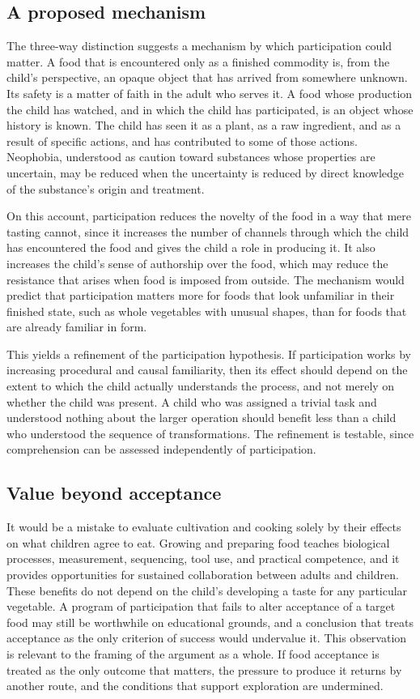 \documentclass[11pt]{article}
\theoremstyle{remark}
\begin{document}
\subsection{A proposed mechanism}

The three-way distinction suggests a mechanism by which participation could matter. A food that is encountered only as a finished commodity is, from the child's perspective, an opaque object that has arrived from somewhere unknown. Its safety is a matter of faith in the adult who serves it. A food whose production the child has watched, and in which the child has participated, is an object whose history is known. The child has seen it as a plant, as a raw ingredient, and as a result of specific actions, and has contributed to some of those actions. Neophobia, understood as caution toward substances whose properties are uncertain, may be reduced when the uncertainty is reduced by direct knowledge of the substance's origin and treatment.

On this account, participation reduces the novelty of the food in a way that mere tasting cannot, since it increases the number of channels through which the child has encountered the food and gives the child a role in producing it. It also increases the child's sense of authorship over the food, which may reduce the resistance that arises when food is imposed from outside. The mechanism would predict that participation matters more for foods that look unfamiliar in their finished state, such as whole vegetables with unusual shapes, than for foods that are already familiar in form.

This yields a refinement of the participation hypothesis. If participation works by increasing procedural and causal familiarity, then its effect should depend on the extent to which the child actually understands the process, and not merely on whether the child was present. A child who was assigned a trivial task and understood nothing about the larger operation should benefit less than a child who understood the sequence of transformations. The refinement is testable, since comprehension can be assessed independently of participation.

\subsection{Value beyond acceptance}

It would be a mistake to evaluate cultivation and cooking solely by their effects on what children agree to eat. Growing and preparing food teaches biological processes, measurement, sequencing, tool use, and practical competence, and it provides opportunities for sustained collaboration between adults and children. These benefits do not depend on the child's developing a taste for any particular vegetable. A program of participation that fails to alter acceptance of a target food may still be worthwhile on educational grounds, and a conclusion that treats acceptance as the only criterion of success would undervalue it. This observation is relevant to the framing of the argument as a whole. If food acceptance is treated as the only outcome that matters, the pressure to produce it returns by another route, and the conditions that support exploration are undermined.
\end{document}
